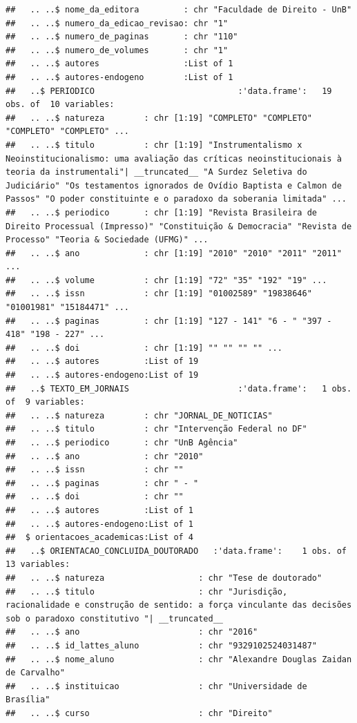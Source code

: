 \documentclass[]{article}
\begin{document}
\begin{verbatim}
##   .. ..$ nome_da_editora         : chr "Faculdade de Direito - UnB"
##   .. ..$ numero_da_edicao_revisao: chr "1"
##   .. ..$ numero_de_paginas       : chr "110"
##   .. ..$ numero_de_volumes       : chr "1"
##   .. ..$ autores                 :List of 1
##   .. ..$ autores-endogeno        :List of 1
##   ..$ PERIODICO                             :'data.frame':   19 obs. of  10 variables:
##   .. ..$ natureza        : chr [1:19] "COMPLETO" "COMPLETO" "COMPLETO" "COMPLETO" ...
##   .. ..$ titulo          : chr [1:19] "Instrumentalismo x Neoinstitucionalismo: uma avaliação das críticas neoinstitucionais à teoria da instrumentali"| __truncated__ "A Surdez Seletiva do Judiciário" "Os testamentos ignorados de Ovídio Baptista e Calmon de Passos" "O poder constituinte e o paradoxo da soberania limitada" ...
##   .. ..$ periodico       : chr [1:19] "Revista Brasileira de Direito Processual (Impresso)" "Constituição & Democracia" "Revista de Processo" "Teoria & Sociedade (UFMG)" ...
##   .. ..$ ano             : chr [1:19] "2010" "2010" "2011" "2011" ...
##   .. ..$ volume          : chr [1:19] "72" "35" "192" "19" ...
##   .. ..$ issn            : chr [1:19] "01002589" "19838646" "01001981" "15184471" ...
##   .. ..$ paginas         : chr [1:19] "127 - 141" "6 - " "397 - 418" "198 - 227" ...
##   .. ..$ doi             : chr [1:19] "" "" "" "" ...
##   .. ..$ autores         :List of 19
##   .. ..$ autores-endogeno:List of 19
##   ..$ TEXTO_EM_JORNAIS                      :'data.frame':   1 obs. of  9 variables:
##   .. ..$ natureza        : chr "JORNAL_DE_NOTICIAS"
##   .. ..$ titulo          : chr "Intervenção Federal no DF"
##   .. ..$ periodico       : chr "UnB Agência"
##   .. ..$ ano             : chr "2010"
##   .. ..$ issn            : chr ""
##   .. ..$ paginas         : chr " - "
##   .. ..$ doi             : chr ""
##   .. ..$ autores         :List of 1
##   .. ..$ autores-endogeno:List of 1
##  $ orientacoes_academicas:List of 4
##   ..$ ORIENTACAO_CONCLUIDA_DOUTORADO   :'data.frame':    1 obs. of  13 variables:
##   .. ..$ natureza                   : chr "Tese de doutorado"
##   .. ..$ titulo                     : chr "Jurisdição, racionalidade e construção de sentido: a força vinculante das decisões sob o paradoxo constitutivo "| __truncated__
##   .. ..$ ano                        : chr "2016"
##   .. ..$ id_lattes_aluno            : chr "9329102524031487"
##   .. ..$ nome_aluno                 : chr "Alexandre Douglas Zaidan de Carvalho"
##   .. ..$ instituicao                : chr "Universidade de Brasília"
##   .. ..$ curso                      : chr "Direito"

\end{verbatim}
\end{document}
